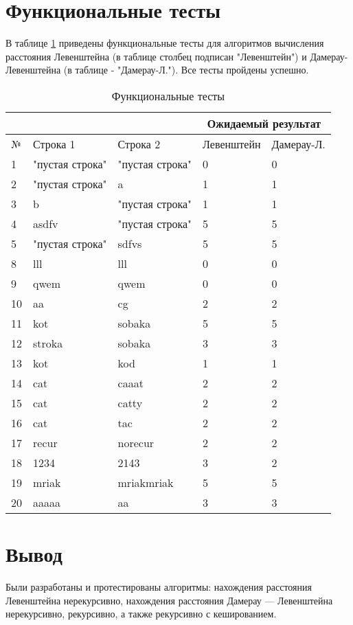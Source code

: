 \section{Функциональные тесты}
В таблице \ref{tabular:functional_test} приведены функциональные тесты для алгоритмов вычисления расстояния Левенштейна (в таблице столбец подписан "Левенштейн") и Дамерау-Левенштейна (в таблице - "Дамерау-Л."). Все тесты пройдены успешно.


\begin{table}[h]
    \begin{center}
    \begin{threeparttable}
    \captionsetup{justification=raggedright,singlelinecheck=off}	\caption{\label{tabular:functional_test} Функциональные тесты}
		\begin{tabular}{|l|l|l|l|l|}
			\hline
			& & & \multicolumn{2}{c|}{Ожидаемый результат} \\
			\hline
			№&Строка 1&Строка 2&Левенштейн&Дамерау-Л. \\
			\hline
			1&"пустая строка"&"пустая строка"&0&0 \\
			\hline
			2&"пустая строка"&a&1&1 \\
			\hline
			3&b&"пустая строка"&1&1 \\
			\hline
			4&asdfv&"пустая строка"&5&5 \\
			\hline
			5&"пустая строка"&sdfvs&5&5 \\
			\hline
			8&lll&lll&0&0 \\
			\hline
			9&qwem&qwem&0&0 \\
			\hline
			10&aa&cg&2&2 \\
			\hline
			11&kot&sobaka&5&5 \\
			\hline
			12&stroka&sobaka&3&3 \\
			\hline
			13&kot&kod&1&1 \\
			\hline
			14&cat&caaat&2&2 \\
			\hline
			15&cat&catty&2&2 \\
			\hline
			16&cat&tac&2&2 \\
			\hline
			17&recur&norecur&2&2 \\
			\hline
			18&1234&2143&3&2 \\
			\hline
			19&mriak&mriakmriak&5&5 \\
			\hline
			20&aaaaa&aa&3&3 \\
			\hline
		\end{tabular}
	\end{threeparttable}
	\end{center}
\end{table}


\newpage

\section*{Вывод}

Были разработаны и протестированы алгоритмы: нахождения расстояния Левенштейна нерекурсивно, нахождения расстояния Дамерау — Левенштейна нерекурсивно, рекурсивно, а также рекурсивно с кешированием.
